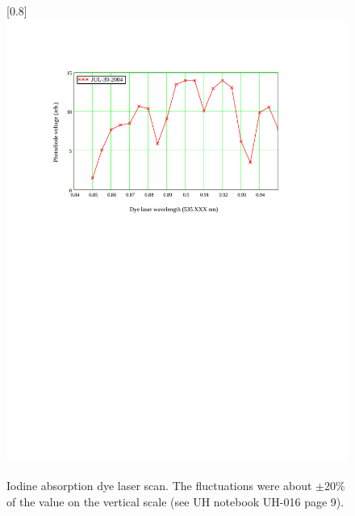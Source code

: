 \begin{figure}
\scalebox{0.8}[0.8]{
\includegraphics[bb=20 450 489 700]
{absorption/absorption.pdf}
}
\caption[Iodine absorption dye laser scan]{Iodine absorption dye laser scan. The fluctuations  were about $\pm20$\% of the value on the vertical scale (see UH notebook UH-016 page 9).}
\label{absorption}
\end{figure}
